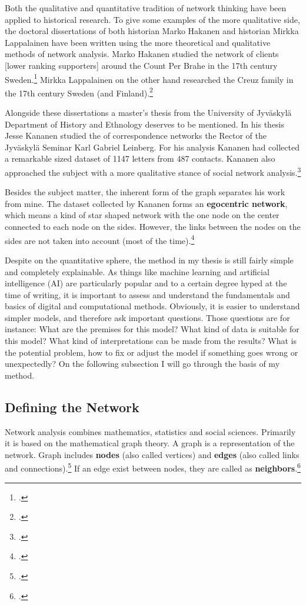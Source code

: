 Both the qualitative and quantitative tradition of network thinking have been applied to historical research. To give some examples of the more qualitative side, the doctoral dissertations of both historian Marko Hakanen and historian Mirkka Lappalainen have been written using the more theoretical and qualitative methods of network analysis. Marko Hakanen studied the network of clients [lower ranking supporters] around the Count Per Brahe in the 17th century Sweden.\footcite{hakanen11} Mirkka Lappalainen on the other hand researched the Creuz family in the 17th century Sweden (and Finland).\footcite{lappalainen05}

Alongside these dissertations a master's thesis from the University of Jyväskylä Department of History and Ethnology deserves to be mentioned. In his thesis Jesse Kananen studied the of correspondence networks the Rector of the Jyväskylä Seminar Karl Gabriel Leinberg. For his analysis Kananen had collected a remarkable sized dataset of 1147 letters from 487 contacts. Kananen also approached the subject with a more qualitative stance of social network analysis.\footcite{kananen18}

Besides the subject matter, the inherent form of the graph separates his work from mine. The dataset collected by Kananen forms an \textbf{egocentric network}, which means a kind of star shaped network with the one node on the center connected to each node on the sides. However, the links between the nodes on the sides are not taken into account (most of the time).\footcite[pp. 22-23.]{kananen18}

Despite on the quantitative sphere, the method in my thesis is still fairly simple and completely explainable. As things like machine learning and artificial intelligence (AI) are particularly popular and to a certain degree hyped at the time of writing, it is important to assess and understand the fundamentals and basics of digital and computational methods. Obviously, it is easier to understand simpler models, and therefore ask important questions. Those questions are for instance: What are the premises for this model? What kind of data is suitable for this model? What kind of interpretations can be made from the results? What is the potential problem, how to fix or adjust the model if something goes wrong or unexpectedly? On the following subsection I will go through the basis of my method.

\subsection{Defining the Network}
\label{network}
Network analysis combines mathematics, statistics and social sciences. Primarily it is based on the mathematical graph theory. A graph is a representation of the network. Graph includes \textbf{nodes} (also called vertices) and \textbf{edges} (also called links and connections).\footcites[p. 247, 248-249.]{huhtamakiEtAl}[pp. vi-vii]{RajPM2018a} If an edge exist between nodes, they are called as \textbf{neighbors}.\footcite[p. vii]{RajPM2018a}

